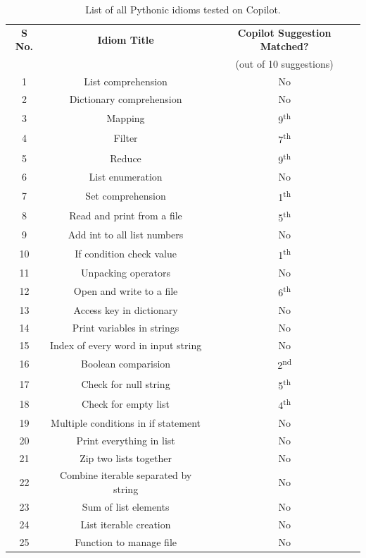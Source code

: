 \renewcommand{\arraystretch}{1.45}
\begin{table}[hbt!]

    \begin{tabular}{|c|c|c|}
        \hline
        \centering
         \textbf{S No.} & \textbf{Idiom Title} & \textbf{Copilot Suggestion Matched?}  \\
         & & (out of 10 suggestions) \\
         \hline
         1 & List comprehension & No \\
         \hline
         2 & Dictionary comprehension & No \\
         \hline
         3 & Mapping & 9\textsuperscript{th} \\
         \hline
         4 & Filter &  7\textsuperscript{th} \\
         \hline
         5 & Reduce & 9\textsuperscript{th} \\
         \hline
         6 & List enumeration & No \\
         \hline
         7 & Set comprehension & 1\textsuperscript{th} \\
         \hline
         8 & Read and print from a file & 5\textsuperscript{th} \\
         \hline
         9 & Add int to all list numbers & No \\
         \hline
         10 & If condition check value & 1\textsuperscript{th} \\
         \hline
         11 & Unpacking operators & No \\
         \hline
         12 & Open and write to a file & 6\textsuperscript{th} \\
         \hline
         13 & Access key in dictionary & No \\
         \hline
         14 & Print variables in strings & No \\
         \hline
         15 & Index of every word in input string & No \\
         \hline
         16 & Boolean comparision & 2\textsuperscript{nd} \\
         \hline
         17 & Check for null string & 5\textsuperscript{th} \\
         \hline
         18 & Check for empty list & 4\textsuperscript{th} \\
         \hline
         19 & Multiple conditions in if statement & No \\
         \hline
         20 & Print everything in list & No \\
         \hline
         21 & Zip two lists together & No \\
         \hline
         22 & Combine iterable separated by string & No \\
         \hline
         23 & Sum of list elements & No \\
         \hline
         24 & List iterable creation & No \\
         \hline
         25 & Function to manage file & No \\
         \hline
    \end{tabular}
    \caption{List of all Pythonic idioms tested on Copilot.}
    \label{tab:all_idioms}
\end{table}